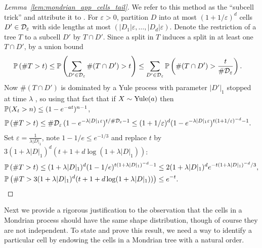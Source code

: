 \begin{proof}[Lemma~\ref{lem:mondrian_app_cells_tail}]

  We refer to this method as the ``subcell trick''
  and attribute it to \citet{mourtada2017universal}.
  For $\varepsilon > 0$, partition $D$ into
  at most $(1 + 1/\varepsilon)^d$ cells $D' \in \cD_\varepsilon$
  with side lengths at most $(|D_1| \varepsilon, \ldots, |D_d| \varepsilon)$.
  Denote the restriction of a tree $T$ to a subcell $D'$ by $T \cap D'$.
  Since a split in $T$ induces a split in at least one $T \cap D'$,
  by a union bound
  \begin{align*}
    \P\left(\# T > t \right)
    &\leq
    \P\left(\sum_{D' \in \cD_\varepsilon}
    \# (T \cap D') > t \right)
    \leq
    \sum_{D' \in \cD_\varepsilon}
    \P\left(
      \# (T \cap D') >
      \frac{t}{\# \cD_\varepsilon}
    \right).
  \end{align*}
  Now $\# (T \cap D')$ is dominated by a Yule process
  with parameter $|D'|_1$ stopped at time $\lambda$
  \citep[proof of Lemma~2]{mourtada2017universal},
  so using that fact that if
  $X \sim \Yule(a)$
  then $\P(X_t > n) \leq (1-e^{-at})^{n-1}$,
  \begin{align*}
    \P\left(\# T > t \right)
    &\leq
    \# \cD_\varepsilon \,
    (1 - e^{-\lambda |D|_1 \varepsilon})^{t / \# \cD_\varepsilon - 1}
    \leq
    (1 + 1/\varepsilon)^d
    (1 - e^{-\lambda |D|_1 \varepsilon})^{t (1 + 1/\varepsilon)^{-d} - 1}.
  \end{align*}
  Set $\varepsilon = \frac{1}{\lambda |D|_1}$,
  note $1-1/e \leq e^{-1/3}$
  and replace $t$ by
  $3 (1 + \lambda |D|_1)^d
  (t + 1 + d \log(1 + \lambda |D|_1))$:
  \begin{align*}
    &\P\left(\# T > t \right)
    \leq
    (1 + \lambda |D|_1)^d
    (1 - 1/e)^{t (1 + \lambda |D|_1)^{-d} - 1}
    \leq
    2 (1 + \lambda |D|_1)^d
    e^{-t (1 + \lambda |D|_1)^{-d} / 3}, \\
    &\P\left(\# T >
      3
      (1 + \lambda |D|_1)^d
      (t + 1 + d \log(1 + \lambda |D|_1))
    \right)
    \leq
    e^{-t}.
  \end{align*}
\end{proof}

Next we provide a rigorous justification to the observation that the cells
in a Mondrian process should have the same shape distribution, though
of course they are not independent. To state and prove this result,
we need a way to identify a particular cell by endowing the
cells in a Mondrian tree with a natural order.

